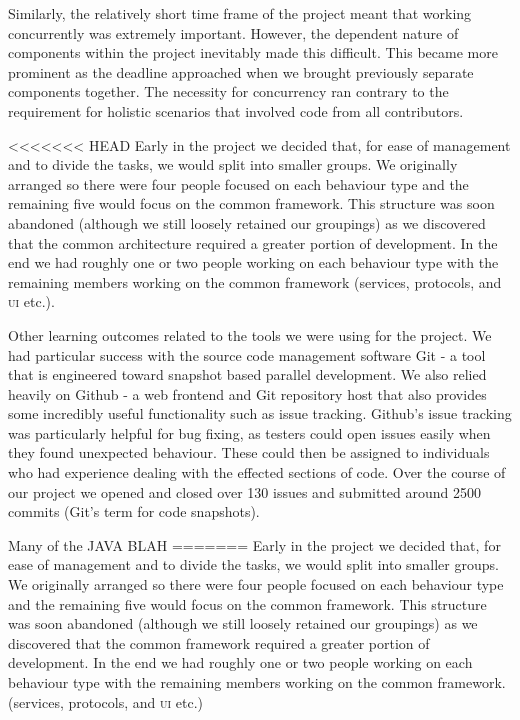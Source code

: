 Similarly, the relatively short time frame of the project meant that working concurrently was extremely important. However, the dependent nature of components within the project inevitably made this difficult. This became more prominent as the deadline approached when we brought previously separate components together. The necessity for concurrency ran contrary to the requirement for holistic scenarios that involved code from all contributors.

<<<<<<< HEAD
Early in the project we decided that, for ease of management and to divide the tasks, we would split into smaller groups. We originally arranged so there were four people focused on each behaviour type and the remaining five would focus on the common framework. This structure was soon abandoned (although we still loosely retained our groupings) as we discovered that the common architecture required a greater portion of development. In the end we had roughly one or two people working on each behaviour type with the remaining members working on the common framework (services, protocols, and \textsc{ui} etc.). 

Other learning outcomes related to the tools we were using for the project. We had particular success with the source code management software Git - a tool that is engineered toward snapshot based parallel development. We also relied heavily on Github - a web frontend and Git repository host that also provides some incredibly useful functionality such as issue tracking. Github's issue tracking was particularly helpful for bug fixing, as testers could open issues easily when they found unexpected behaviour. These could then be assigned to individuals who had experience dealing with the effected sections of code. Over the course of our project we opened and closed over 130 issues and submitted around 2500 commits (Git's term for code snapshots).

Many of the JAVA BLAH
=======
Early in the project we decided that, for ease of management and to divide the tasks, we would split into smaller groups. We originally arranged so there were four people focused on each behaviour type and the remaining five would focus on the common framework. This structure was soon abandoned (although we still loosely retained our groupings) as we discovered that the common framework required a greater portion of development. In the end we had roughly one or two people working on each behaviour type with the remaining members working on the common framework. (services, protocols, and \textsc{ui} etc.) 

